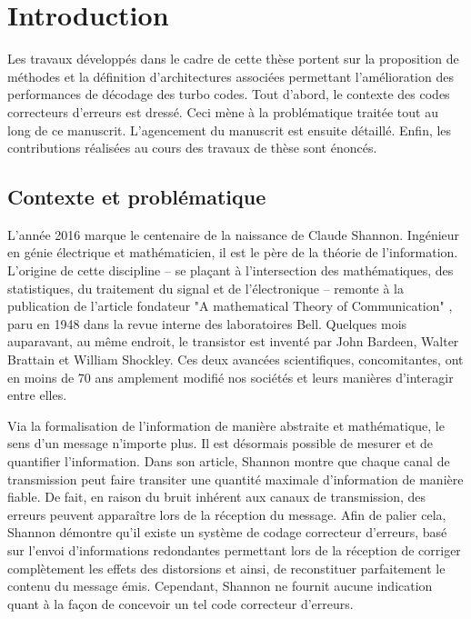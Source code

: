 \chapter*{Introduction}

Les travaux développés dans le cadre de cette thèse portent sur la proposition de méthodes et la définition 
d'architectures associées permettant 
l'amélioration des performances de décodage des turbo codes. Tout d'abord, le contexte des codes correcteurs d'erreurs 
est dressé. Ceci mène à la problématique traitée tout au long de ce manuscrit. L'agencement du manuscrit est 
ensuite détaillé. Enfin, les contributions réalisées au cours des travaux de thèse sont énoncés.

\section*{Contexte et problématique}
L'année 2016 marque le centenaire de la naissance de Claude Shannon. Ingénieur en génie électrique et mathématicien, il 
est le père de la théorie de l'information. L'origine de cette discipline -- se plaçant à l'intersection des mathématiques, 
des statistiques, du traitement du signal et de l'électronique -- remonte à la publication de l'article fondateur 
"A mathematical Theory of Communication" \cite{shannon_mathematical_2001}, paru en 1948 dans la revue interne des laboratoires Bell. Quelques mois 
auparavant, au même endroit, le transistor est inventé par John Bardeen, Walter Brattain et William Shockley. Ces deux 
avancées scientifiques, concomitantes, ont en moins de 70 ans amplement modifié nos sociétés et leurs manières d’interagir entre elles. 

Via la formalisation de l'information de manière abstraite et mathématique, le sens d'un message n'importe plus. Il est 
désormais possible de mesurer et de quantifier l'information. %
Dans son article, Shannon montre que chaque canal de transmission peut faire transiter une quantité maximale 
d'information de manière fiable. De fait, en raison du bruit inhérent aux canaux de transmission, des erreurs peuvent apparaître
lors de la réception du message. Afin de palier cela, Shannon démontre qu'il existe un système de codage correcteur d'erreurs, 
basé sur l'envoi d'informations redondantes
permettant lors de la réception de corriger complètement les effets des distorsions et ainsi, de reconstituer parfaitement
le contenu du message émis. Cependant, Shannon ne fournit aucune indication quant à la façon de concevoir un tel code
correcteur d'erreurs.

